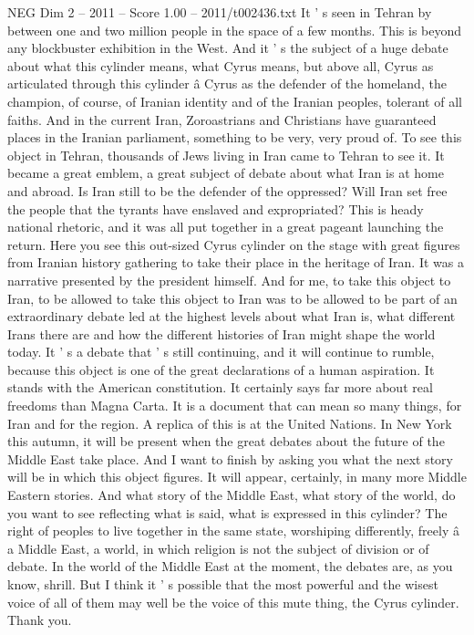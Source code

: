\begin{textsample}{NEG Dim 2 – 2011 – Score 1.00 – 2011/t002436.txt}
It ' s seen in Tehran by between one and two million people in the space of a few months.
This is beyond any blockbuster exhibition in the West.
And it ' s the subject of a huge debate about what this cylinder means, what Cyrus means, but above all, Cyrus as articulated through this cylinder â Cyrus as the defender of the homeland, the champion, of course, of Iranian identity and of the Iranian peoples, tolerant of all faiths.
And in the current Iran, Zoroastrians and Christians have guaranteed places in the Iranian parliament, something to be very, very proud of.
To see this object in Tehran, thousands of Jews living in Iran came to Tehran to see it.
It became a great emblem, a great subject of debate about what Iran is at home and abroad.
Is Iran still to be the defender of the oppressed?
Will Iran set free the people that the tyrants have enslaved and expropriated?
This is heady national rhetoric, and it was all put together in a great pageant launching the return.
Here you see this out-sized Cyrus cylinder on the stage with great figures from Iranian history gathering to take their place in the heritage of Iran.
It was a narrative presented by the president himself.
And for me, to take this object to Iran, to be allowed to take this object to Iran was to be allowed to be part of an extraordinary debate led at the highest levels about what Iran is, what different Irans there are and how the different histories of Iran might shape the world today.
It ' s a debate that ' s still continuing, and it will continue to rumble, because this object is one of the great declarations of a human aspiration.
It stands with the American constitution.
It certainly says far more about real freedoms than Magna Carta.
It is a document that can mean so many things, for Iran and for the region.
A replica of this is at the United Nations.
In New York this autumn, it will be present when the great debates about the future of the Middle East take place.
And I want to finish by asking you what the next story will be in which this object figures.
It will appear, certainly, in many more Middle Eastern stories.
And what story of the Middle East, what story of the world, do you want to see reflecting what is said, what is expressed in this cylinder?
The right of peoples to live together in the same state, worshiping differently, freely â a Middle East, a world, in which religion is not the subject of division or of debate.
In the world of the Middle East at the moment, the debates are, as you know, shrill.
But I think it ' s possible that the most powerful and the wisest voice of all of them may well be the voice of this mute thing, the Cyrus cylinder.
Thank you.

\end{textsample}
